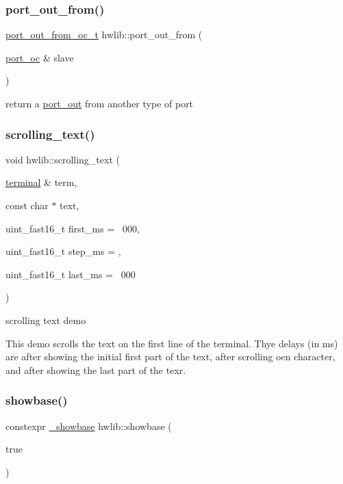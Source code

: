 \subsubsection{\texorpdfstring{port\+\_\+out\+\_\+from()}{port\_out\_from()}}
{\footnotesize\ttfamily \hyperlink{classhwlib_1_1port__out__from__oc__t}{port\+\_\+out\+\_\+from\+\_\+oc\+\_\+t} hwlib\+::port\+\_\+out\+\_\+from (\begin{DoxyParamCaption}\item[{\hyperlink{classhwlib_1_1port__oc}{port\+\_\+oc} \&}]{slave }\end{DoxyParamCaption})}

return a \hyperlink{classhwlib_1_1port__out}{port\+\_\+out} from another type of port \mbox{\label{namespacehwlib_a26e9f9f673f95ec60d66ef4f269fe45d}} 
\subsubsection{\texorpdfstring{scrolling\+\_\+text()}{scrolling\_text()}}
{\footnotesize\ttfamily void hwlib\+::scrolling\+\_\+text (\begin{DoxyParamCaption}\item[{\hyperlink{classhwlib_1_1terminal}{terminal} \&}]{term,  }\item[{const char $\ast$}]{text,  }\item[{uint\+\_\+fast16\+\_\+t}]{first\+\_\+ms = {~\textquotesingle{}000},  }\item[{uint\+\_\+fast16\+\_\+t}]{step\+\_\+ms = {},  }\item[{uint\+\_\+fast16\+\_\+t}]{last\+\_\+ms = {~\textquotesingle{}000} }\end{DoxyParamCaption})}

scrolling text demo

This demo scrolls the text on the first line of the terminal. Thye delays (in ms) are after showing the initial first part of the text, after scrolling oen character, and after showing the last part of the texr. \mbox{\label{namespacehwlib_a84adb21b2d054d3b70c6b26af5f44566}} 
\subsubsection{\texorpdfstring{showbase()}{showbase()}}
{\footnotesize\ttfamily constexpr \hyperlink{structhwlib_1_1__showbase}{\+\_\+showbase} hwlib\+::showbase (\begin{DoxyParamCaption}\item[{true}]{ }\end{DoxyParamCaption})}

